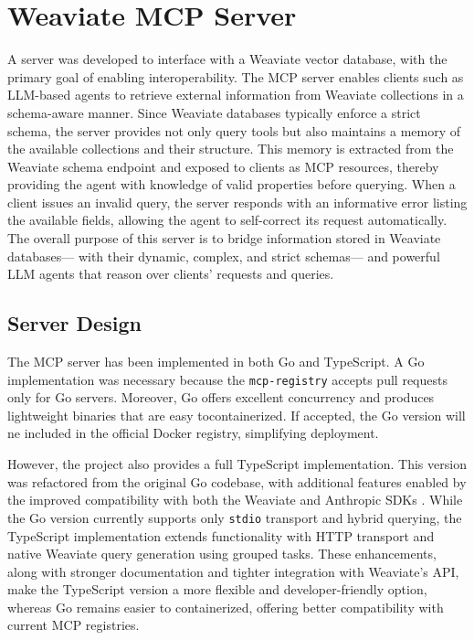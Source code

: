 \section{Weaviate MCP Server}\label{sec:weaviate-mcp-server}
A  server was developed to interface with a Weaviate vector database, with the primary goal of enabling interoperability. The MCP server enables clients such as \gls{LLM}-based agents to retrieve external information from Weaviate collections in a schema-aware manner. Since Weaviate databases typically enforce a strict schema, the server provides not only query tools but also maintains a memory of the available collections and their structure. This memory is extracted from the Weaviate schema endpoint and exposed to clients as MCP resources, thereby providing the agent with knowledge of valid properties before querying. When a client issues an invalid query, the server responds with an informative error listing the available fields, allowing the agent to self-correct its request automatically. The overall purpose of this server is to bridge information stored in Weaviate databases— with their dynamic, complex, and strict schemas— and powerful \gls{LLM} agents that reason over clients' requests and queries.

\subsection{Server Design}

The MCP server has been implemented in both Go and TypeScript. A Go implementation was necessary because the \texttt{mcp-registry} accepts pull requests only for Go servers. Moreover, Go offers excellent concurrency and produces lightweight binaries that are easy tocontainerized. If accepted, the Go version will ne included  in the official Docker registry, simplifying deployment.

However, the project also provides a full TypeScript implementation. This version was refactored from the original Go codebase, with additional features enabled by the improved compatibility with both the Weaviate and Anthropic SDKs \cite{stainless_mcp_comparison}. While the Go version currently supports only \texttt{stdio} transport and hybrid querying, the TypeScript implementation extends functionality with HTTP transport and native Weaviate query generation using grouped tasks. These enhancements, along with stronger documentation and tighter integration with Weaviate’s API, make the TypeScript version a more flexible and developer-friendly option, whereas Go remains easier to containerized, offering better compatibility with current \gls{MCP} registries.
